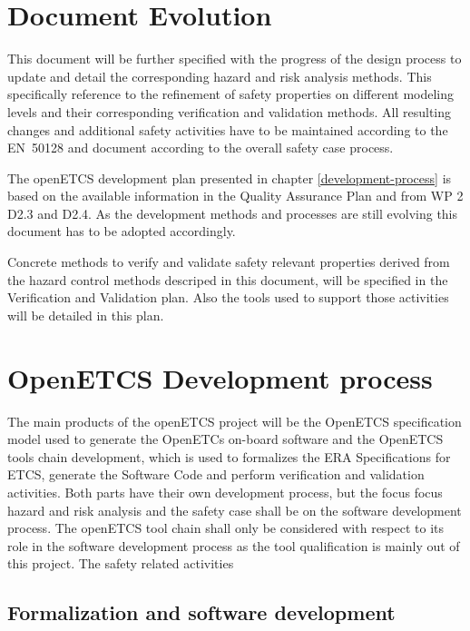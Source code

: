 \documentclass{template/openetcs_report}
\begin{document}

\chapter{Document Evolution}

This document will be further specified with the progress of the design process to update and detail the corresponding hazard and risk analysis methods. This specifically reference to the refinement of safety properties on different modeling levels and their corresponding verification and validation methods. All resulting changes and additional safety activities have to be maintained according to the EN~50128 and document according to the overall safety case process. 

The openETCS development plan presented in chapter \ref{development-process} is based on the available information in the Quality Assurance Plan and from WP 2 D2.3 and D2.4. As the development methods and processes are still evolving this document has to be adopted accordingly.

Concrete methods to verify and validate safety relevant properties derived from the hazard control methods descriped in this document, will be specified in the Verification and Validation plan. Also the tools used to support those activities will be detailed in this plan.

\chapter{OpenETCS Development process}

The main products of the openETCS project will be the OpenETCS specification model used to generate the OpenETCs on-board software and the OpenETCS tools chain development, which is used to formalizes the ERA Specifications for ETCS, generate the Software Code and perform verification and validation activities. Both parts have their own development process, but the focus focus hazard and risk analysis and the safety case shall be on the software development process. The openETCS tool chain shall only be considered with respect to its role in the software development process as the tool qualification is mainly out of this project.
The safety related activities 

\section{Formalization and software development}
\end{document}
